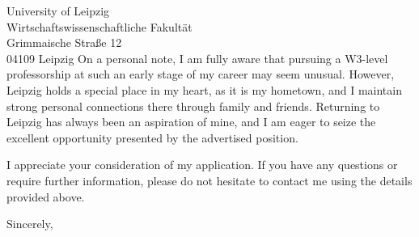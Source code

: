 \documentclass[11pt, a4paper]{letter}
\begin{document}
\begin{letter}{University of Leipzig \\ Wirtschaftswissenschaftliche Fakultät \\ Grimmaische Straße 12 \\ 04109 Leipzig}
On a personal note, I am fully aware that pursuing a W3-level professorship at such an early stage of my career may seem unusual. However, Leipzig holds a special place in my heart, as it is my hometown, and I maintain strong personal connections there through family and friends. Returning to Leipzig has always been an aspiration of mine, and I am eager to seize the excellent opportunity presented by the advertised position.

I appreciate your consideration of my application. If you have any questions or require further information, please do not hesitate to contact me using the details provided above.


\begin{flushleft}
\closing{Sincerely,}
\end{flushleft}

\end{letter}
\endgroup
\end{document}
